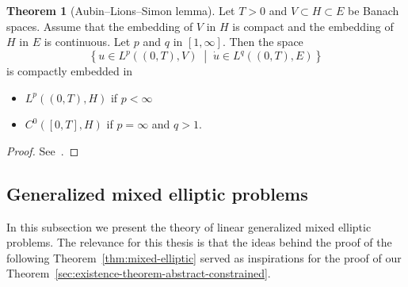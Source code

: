 \documentclass[a4paper,10pt,oneside]{amsbook}
\numberwithin{section}{chapter}
\numberwithin{equation}{chapter}
\theoremstyle{definition}
\newtheorem{thm}[prop]{Theorem}
\begin{document}
\begin{thm}[Aubin--Lions--Simon lemma]
\label{thm:aubin-lions}
Let $T>0$ and $V\subset H\subset E$ be Banach spaces. Assume that the embedding of $V$ in $H$ is compact and the embedding of $H$ in $E$ is continuous. Let $p$ and $q$ in $[1,\infty]$. Then the space
\[
\left\{u\in L^p((0,T),V)\;\middle|\;\dot u\in L^q((0,T),E)\right\}
\]
is compactly embedded in
\begin{itemize}
\item[(i)] $L^p((0,T),H)$ if $p<\infty$
\item[(ii)] $C^0([0,T],H)$ if $p=\infty$ and $q>1$.
\end{itemize}
\end{thm}
\begin{proof}
See~\cite[Theorem~II.5.16]{math-tool-ns}.
\end{proof}

\subsection{Generalized mixed elliptic problems}

In this subsection we present the theory of linear generalized mixed elliptic problems. The relevance for this thesis is that the ideas behind the proof of the following Theorem~\ref{thm:mixed-elliptic} served as inspirations for the proof of our Theorem~\ref{sec:existence-theorem-abstract-constrained}.
\end{document}
